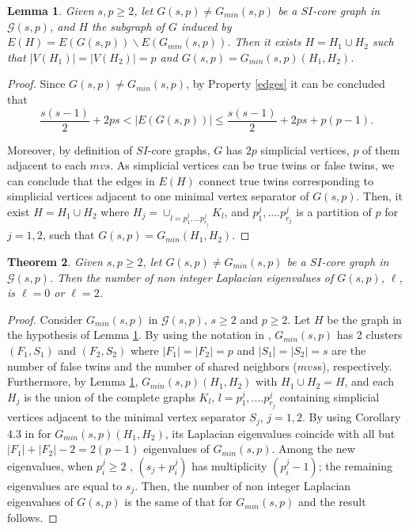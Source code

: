 \documentclass[preprint,12pt]{elsarticle}
\newtheorem{theorem}{Theorem}
\newtheorem{lemma}[theorem]{Lemma}
\begin{document}
\begin{lemma}\label{graphH}
Given $s,p \geq 2$, let $G(s,p) \not = G_{min}(s,p)$ be a $SI$-core graph in $\mathcal{G}(s,p)$, and $H$ the subgraph of $G$ induced by  $E(H) = E(G(s,p)) \backslash E(G_{min}(s,p))$. Then it exists $H = H_1 \cup H_2$ such that $|V(H_1)| = |V(H_2)| = p$ and  $G(s,p) = G_{min}(s,p)(H_1, H_2)$.
\end{lemma}

\begin{proof}
Since $G(s,p) \not = G_{min}(s,p)$, by Property \ref{edges} it can be concluded that
$$\frac{s(s-1)}{2} +2ps < |E(G(s,p) )| \leq  \frac{s(s-1)}{2} +2ps+ p(p-1). $$

Moreover, by definition of $SI$-core graphs, $G$ has $2p$ simplicial vertices, $p$ of them adjacent to each $mvs$.
As simplicial vertices can be true twins or false twins, we can conclude that the edges in $E(H)$ connect true twins corresponding to simplicial vertices adjacent to one minimal vertex separator of $G(s,p)$. 
Then, it exist $H = H_1 \cup H_2$ where  $H_j = \cup_{l=p^j_1,...p^j_{r_j}} K_l$, and $p^j_1, .... p^j_{r_j}$  is a partition of $p$ for $j=1, 2$, such that $G(s,p) = G_{min}(H_1, H_2)$. 
\end{proof}

\begin{theorem}\label{theo:principalplainnotmin}
Given $s,p \geq 2$, let $G(s,p)  \not = G_{min}(s,p)$ be a $SI$-core graph in $\mathcal{G}(s,p)$. 
Then the number of non integer Laplacian eigenvalues of $G(s,p)$, $\ell$, is
$ \ell = 0$ or $ \ell = 2$.
\end{theorem}

\begin{proof}
Consider $G_{min}(s,p)$ in $\mathcal{G}(s,p)$, $s \geq 2$ and $p\geq 2$. 
Let $H$ be the graph in the hypothesis of Lemma \ref{graphH}. By using the notation in \cite{CR17}, $G_{min}(s,p)$ has 2 clusters $(F_1, S_1)$ and $(F_2, S_2)$  where $|F_1| = |F_2| = p$ and $|S_1| = |S_2| = s$ are the number of false twins and the number of shared neighbors ($mvs$s), respectively. 
Furthermore, by Lemma \ref{graphH}, $G_{min}(s,p)(H_1, H_2)$ with $H_1 \cup H_2 = H$, 
and each $H_j$ is the union of the complete graphs $K_l$, $l = p^j_1, .... p^j_{r_j}$ containing simplicial vertices adjacent to the minimal vertex separator $S_j$, $ j= 1, 2$.
By using Corollary 4.3 in \cite{CR17} for $G_{min}(s,p)(H_1, H_2)$, its Laplacian eigenvalues coincide with all but $|F_1| + |F_2| - 2 = 2(p-1)$ eigenvalues of $G_{min}(s,p)$. 
 Among the  new  eigenvalues,  when $p^j_i \geq 2$ , $(s_j + p^j_i)$ has multiplicity $(p^j_i -1)$;  
the remaining eigenvalues are equal to $s_j$.
Then, the number of non integer Laplacian eigenvalues of $G(s,p)$ is the same of that for $G_{min}(s,p)$ and  the result follows.  
\end{proof}
\end{document}
